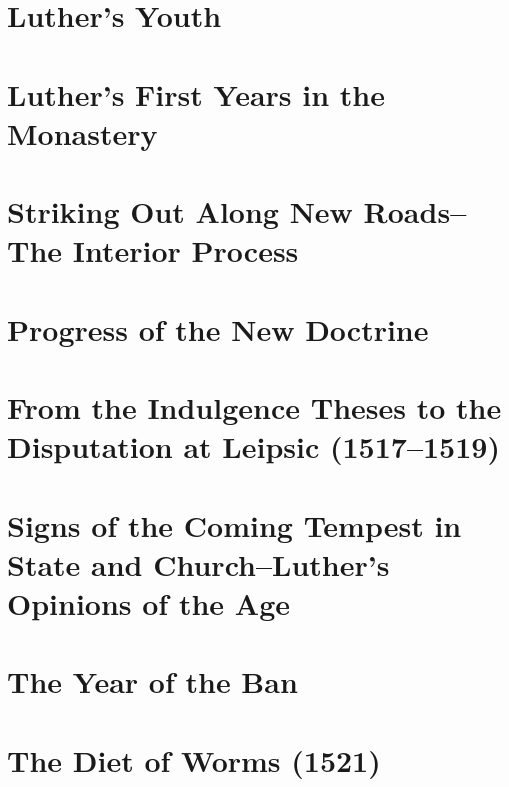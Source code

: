 \chapter{Luther’s Youth}




\chapter{Luther's First Years in the Monastery}




\chapter{Striking Out Along New Roads--The Interior Process}



\chapter{Progress of the New Doctrine}





\chapter{From the Indulgence Theses to the Disputation at Leipsic (1517--1519)}



\chapter{Signs of the Coming Tempest in State and Church--Luther’s Opinions of the Age}




\chapter{The Year of the Ban}





\chapter{The Diet of Worms (1521)}



